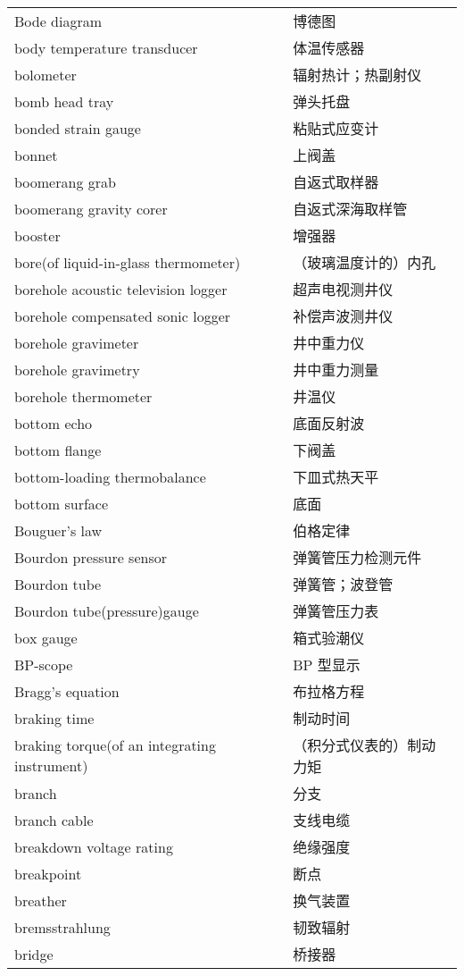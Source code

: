 \documentclass[
]{article}
\begin{document}
\begin{longtable}[]{@{}ll@{}}
Bode diagram & 博德图 \\
body temperature transducer & 体温传感器 \\
bolometer & 辐射热计；热副射仪 \\
bomb head tray & 弹头托盘 \\
bonded strain gauge & 粘贴式应变计 \\
bonnet & 上阀盖 \\
boomerang grab & 自返式取样器 \\
boomerang gravity corer & 自返式深海取样管 \\
booster & 增强器 \\
bore(of liquid-in-glass thermometer) & （玻璃温度计的）内孔 \\
borehole acoustic television logger & 超声电视测井仪 \\
borehole compensated sonic logger & 补偿声波测井仪 \\
borehole gravimeter & 井中重力仪 \\
borehole gravimetry & 井中重力测量 \\
borehole thermometer & 井温仪 \\
bottom echo & 底面反射波 \\
bottom flange & 下阀盖 \\
bottom-loading thermobalance & 下皿式热天平 \\
bottom surface & 底面 \\
Bouguer's law & 伯格定律 \\
Bourdon pressure sensor & 弹簧管压力检测元件 \\
Bourdon tube & 弹簧管；波登管 \\
Bourdon tube(pressure)gauge & 弹簧管压力表 \\
box gauge & 箱式验潮仪 \\
BP-scope & BP 型显示 \\
Bragg's equation & 布拉格方程 \\
braking time & 制动时间 \\
braking torque(of an integrating instrument) &
（积分式仪表的）制动力矩 \\
branch & 分支 \\
branch cable & 支线电缆 \\
breakdown voltage rating & 绝缘强度 \\
breakpoint & 断点 \\
breather & 换气装置 \\
bremsstrahlung & 韧致辐射 \\
bridge & 桥接器 \\

\end{longtable}
\end{document}
